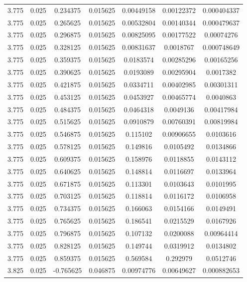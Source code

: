 \begin{table}[bh]
\begin{center}
{\begin{tabular}{ccccccc}
3.775	 & 0.025 & 	0.234375	 & 0.015625	 & 0.00449158	 & 0.00122372	 & 0.000404337 \\ 
3.775	 & 0.025 & 	0.265625	 & 0.015625	 & 0.00532804	 & 0.00140344	 & 0.000479637 \\ 
3.775	 & 0.025 & 	0.296875	 & 0.015625	 & 0.00825095	 & 0.00177522	 & 0.00074276 \\ 
3.775	 & 0.025 & 	0.328125	 & 0.015625	 & 0.00831637	 & 0.0018767	 & 0.000748649 \\ 
3.775	 & 0.025 & 	0.359375	 & 0.015625	 & 0.0183574	 & 0.00285296	 & 0.00165256 \\ 
3.775	 & 0.025 & 	0.390625	 & 0.015625	 & 0.0193089	 & 0.00295904	 & 0.0017382 \\ 
3.775	 & 0.025 & 	0.421875	 & 0.015625	 & 0.0334711	 & 0.00402985	 & 0.00301311 \\ 
3.775	 & 0.025 & 	0.453125	 & 0.015625	 & 0.0453927	 & 0.00465774	 & 0.0040863 \\ 
3.775	 & 0.025 & 	0.484375	 & 0.015625	 & 0.0464318	 & 0.0049136	 & 0.00417984 \\ 
3.775	 & 0.025 & 	0.515625	 & 0.015625	 & 0.0910879	 & 0.00760391	 & 0.00819984 \\ 
3.775	 & 0.025 & 	0.546875	 & 0.015625	 & 0.115102	 & 0.00906655	 & 0.0103616 \\ 
3.775	 & 0.025 & 	0.578125	 & 0.015625	 & 0.149816	 & 0.0105492	 & 0.0134866 \\ 
3.775	 & 0.025 & 	0.609375	 & 0.015625	 & 0.158976	 & 0.0118855	 & 0.0143112 \\ 
3.775	 & 0.025 & 	0.640625	 & 0.015625	 & 0.148814	 & 0.0116697	 & 0.0133964 \\ 
3.775	 & 0.025 & 	0.671875	 & 0.015625	 & 0.113301	 & 0.0103643	 & 0.0101995 \\ 
3.775	 & 0.025 & 	0.703125	 & 0.015625	 & 0.118814	 & 0.0116172	 & 0.0106958 \\ 
3.775	 & 0.025 & 	0.734375	 & 0.015625	 & 0.166063	 & 0.0154166	 & 0.0149491 \\ 
3.775	 & 0.025 & 	0.765625	 & 0.015625	 & 0.186541	 & 0.0215529	 & 0.0167926 \\ 
3.775	 & 0.025 & 	0.796875	 & 0.015625	 & 0.107132	 & 0.0200088	 & 0.00964414 \\ 
3.775	 & 0.025 & 	0.828125	 & 0.015625	 & 0.149744	 & 0.0319912	 & 0.0134802 \\ 
3.775	 & 0.025 & 	0.859375	 & 0.015625	 & 0.569584	 & 0.292979	 & 0.0512746 \\ 
3.825	 & 0.025 & 	-0.765625	 & 0.046875	 & 0.00974776	 & 0.00649627	 & 0.000882653 \\ 

\end{tabular}}
\end{center}
\end{table}
